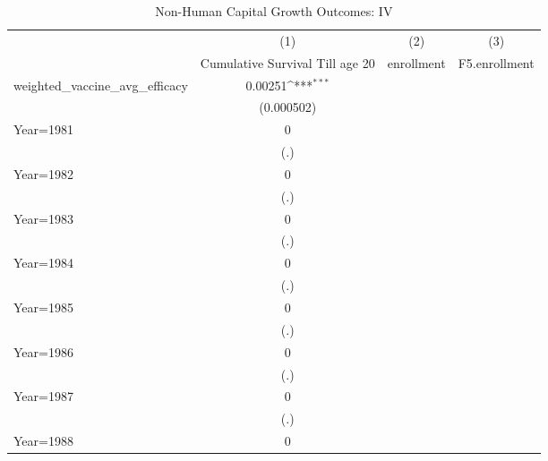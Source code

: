 \begin{table}[htbp]\centering
\def\sym#1{\ifmmode^{#1}\else\(^{#1}\)\fi}
\caption{Non-Human Capital Growth Outcomes: IV}
\begin{tabular}{l*{3}{c}}
\toprule
                &\multicolumn{1}{c}{(1)}&\multicolumn{1}{c}{(2)}&\multicolumn{1}{c}{(3)}\\
                &\multicolumn{1}{c}{Cumulative Survival Till age 20}&\multicolumn{1}{c}{enrollment}&\multicolumn{1}{c}{F5.enrollment}\\
\midrule
weighted\_vaccine\_avg\_efficacy&  0.00251\sym{***}&                  &                  \\
                &(0.000502)         &                  &                  \\
\addlinespace
Year=1981       &        0         &                  &                  \\
                &      (.)         &                  &                  \\
\addlinespace
Year=1982       &        0         &                  &                  \\
                &      (.)         &                  &                  \\
\addlinespace
Year=1983       &        0         &                  &                  \\
                &      (.)         &                  &                  \\
\addlinespace
Year=1984       &        0         &                  &                  \\
                &      (.)         &                  &                  \\
\addlinespace
Year=1985       &        0         &                  &                  \\
                &      (.)         &                  &                  \\
\addlinespace
Year=1986       &        0         &                  &                  \\
                &      (.)         &                  &                  \\
\addlinespace
Year=1987       &        0         &                  &                  \\
                &      (.)         &                  &                  \\
\addlinespace
Year=1988       &        0         &                  &                  \\

\end{tabular}
\end{table}
